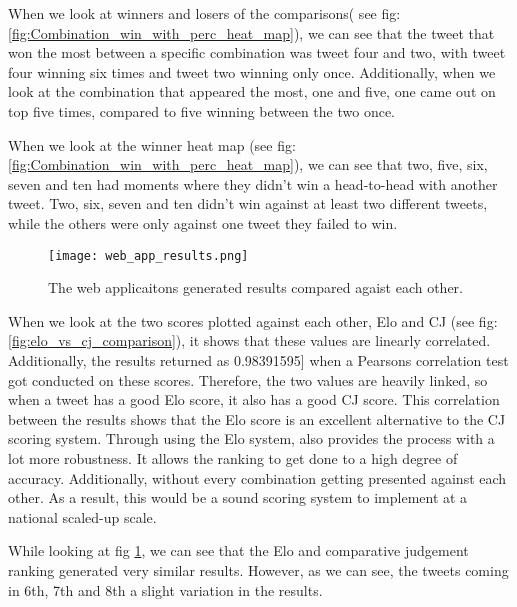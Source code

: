 	When we look at winners and losers of the comparisons( see fig: \ref{fig:Combination_win_with_perc_heat_map}), we can see that the tweet that won the most between a specific combination was tweet four and two, with tweet four winning six times and tweet two winning only once. Additionally, when we look at the combination that appeared the most, one and five, one came out on top five times, compared to five winning between the two once.
	
	When we look at the winner heat map (see fig: \ref{fig:Combination_win_with_perc_heat_map}), we can see that two, five, six, seven and ten had moments where they didn't win a head-to-head with another tweet. Two, six, seven and ten didn't win against at least two different tweets, while the others were only against one tweet they failed to win.
	
		
	
\begin{figure}[t]
	\centering
	\texttt{[image: web\_app\_results.png]}
	\caption{The web applicaitons generated results compared agaist each other.}
	\label{fig:web_app_results}
	
\end{figure}
	

	When we look at the two scores plotted against each other, Elo and CJ (see fig: \ref{fig:elo_vs_cj_comparison}), it shows that these values are linearly correlated. Additionally, the results returned as 0.98391595] when a Pearsons correlation test got conducted on these scores. Therefore, the two values are heavily linked, so when a tweet has a good Elo score, it also has a good CJ score. This correlation between the results shows that the Elo score is an excellent alternative to the CJ scoring system. Through using the Elo system, also provides the process with a lot more robustness. It allows the ranking to get done to a high degree of accuracy. Additionally, without every combination getting presented against each other. As a result, this would be a sound scoring system to implement at a national scaled-up scale.

	While looking at fig \ref{fig:web_app_results}, we can see that the Elo and comparative judgement ranking generated very similar results. However, as we can see, the tweets coming in 6th, 7th and 8th a slight variation in the results.
	
